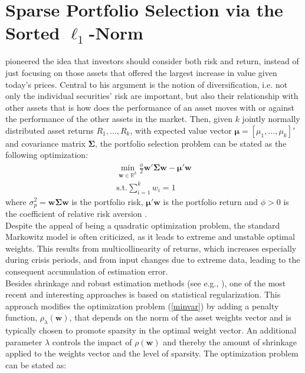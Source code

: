 \documentclass[12pt, a4paper]{article}
\newcommand{\bfw}{\boldsymbol{w} }
\newcommand{\bfmu}{\boldsymbol{\mu} }
\newcommand{\bfSigma}{\boldsymbol{\Sigma} }
\begin{document}
\section{Sparse Portfolio Selection via the Sorted $\ell_1$-Norm}%
\cite{Markowitz1952} pioneered the idea that investors should consider both risk and return, instead of just focusing on those assets that offered the largest increase in value given today's prices. Central to his argument is the notion of diversification, i.e. not only the individual securities' risk are important, but also their relationship with other assets that is how does the performance of an asset moves with or against the performance of the other assets in the market. Then, given $k$ jointly normally distributed asset returns $R_1, \ldots, R_k$, with expected value vector $\bfmu = [\mu_{1}, ..., \mu_{k}]'$ and covariance matrix $\bfSigma$, the \cite{Markowitz1952} portfolio selection problem can be stated as the following optimization:%
%
\begin{gather}\label{minvar}%
\min_{\bfw \in \mathbb{R}^k} \frac{\phi}{2} \bfw'\bfSigma \bfw - \bfmu'\bfw \\
\text{s.t.} \sum_{i=1}^k w_i = 1
\end{gather}
%
\noindent
where $\sigma_{p}^{2} = \bfw\bfSigma \bfw$ is the portfolio risk, $\bfmu' \bfw$ is the portfolio return and $\phi > 0$ is the coefficient of relative risk aversion \citep{Markowitz1952, Fan2012, Li2015}. \\ %
Despite the appeal of being a quadratic optimization problem, the standard Markowitz model is often criticized, as it leads to extreme and unstable optimal weights. This results from multicollinearity of returns, which increases especially during crisis periods, and from input changes due to extreme data, leading to the consequent accumulation of estimation error. \\
Besides shrinkage and robust estimation methods (see e.g., \cite{Ledoit2004, Welsch2007, Kolm2014}), one of the most recent and interesting approaches is based on statistical regularization. This approach modifies the optimization problem (\ref{minvar}) by adding a penalty function, $\rho_{\lambda}(\bfw)$, that depends on the norm of the asset weights vector and is typically chosen to promote sparsity in the optimal weight vector. An additional parameter $\lambda$ controls the impact of $\rho(\bfw)$ and thereby the amount of shrinkage applied to the weights vector and the level of sparsity. The optimization problem can be stated as:
\end{document}
